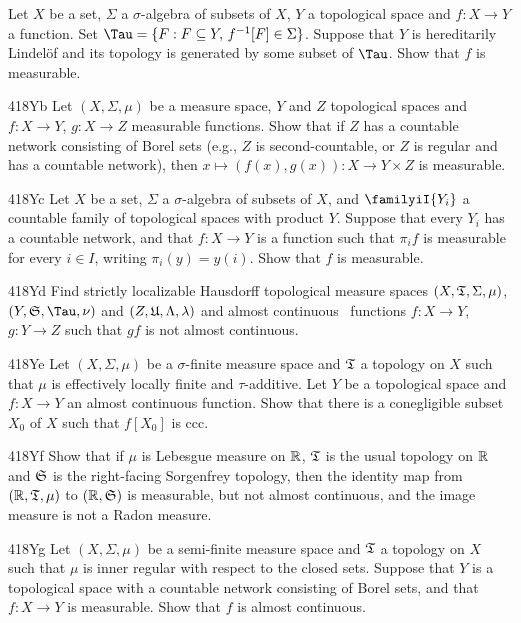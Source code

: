 {
Let $X$ be a set, $\Sigma$ a $\sigma$-algebra of subsets of $X$, $Y$ a
topological space and $f:X\to Y$ a function.   Set
$\Tau=\{F:F\subseteq Y,\,f^{-1}[F]\in\Sigma\}$.   Suppose that $Y$ is
hereditarily Lindel\"of and its topology is generated by some subset of
$\Tau$.   Show that $f$ is measurable.

\spheader 418Yb Let $(X,\Sigma,\mu)$ be a measure space, $Y$ and $Z$
topological spaces
and $f:X\to Y$, $g:X\to Z$ measurable functions.   Show that if $Z$ has
a countable network consisting of Borel sets (e.g., $Z$ is
second-countable, or $Z$ is regular and has a countable network), then
$x\mapsto (f(x),g(x)):X\to Y\times Z$ is measurable.

\spheader 418Yc Let $X$ be a set, $\Sigma$ a $\sigma$-algebra of subsets
of $X$, and $\familyiI{Y_i}$ a countable family of topological spaces
with product $Y$.   Suppose that every $Y_i$ has a countable network,
and that $f:X\to Y$ is a function such that $\pi_if$ is measurable for
every $i\in I$, writing $\pi_i(y)=y(i)$.   Show that $f$ is measurable.

\spheader 418Yd Find strictly localizable Hausdorff topological measure
spaces $(X,\frak T,\Sigma,\mu)$, $(Y,\frak S,\Tau,\nu)$ and
$(Z,\frak U,\Lambda,\lambda)$ and almost continuous \imp\ functions
$f:X\to Y$, $g:Y\to Z$ such that $gf$ is not almost continuous.

\spheader 418Ye Let $(X,\Sigma,\mu)$ be a $\sigma$-finite measure space
and $\frak T$ a topology on $X$ such that $\mu$ is effectively locally
finite and $\tau$-additive.   Let $Y$ be a topological space and
$f:X\to Y$ an almost continuous function.   Show that there is a
conegligible subset $X_0$ of $X$ such that $f[X_0]$ is ccc.

\spheader 418Yf Show that if $\mu$ is Lebesgue measure on $\Bbb R$,
$\frak T$ is the usual topology on $\Bbb R$ and
$\frak S$ is the right-facing Sorgenfrey topology, then the
identity map from $(\Bbb R,\frak T,\mu)$ to $(\Bbb R,\frak S)$ is
measurable, but not almost continuous, and the image
measure is not a Radon measure.

\spheader 418Yg Let $(X,\Sigma,\mu)$ be a semi-finite measure space and
$\frak T$ a topology on $X$ such that $\mu$ is inner regular with
respect to the closed sets.   Suppose that $Y$ is a topological space
with a countable network consisting of Borel sets, and that $f:X\to Y$
is measurable.   Show that $f$ is almost continuous.

}
